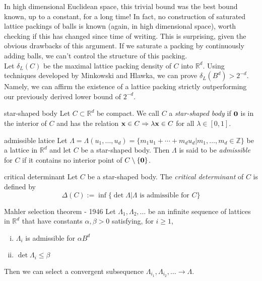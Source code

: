 \documentclass{article}
\begin{document}
In high dimensional Euclidean space, this trivial bound was the best bound known, up to a constant, for a long 
time! In fact, no construction of saturated lattice packings of balls is known (again, in high dimensional space), worth 
checking if this has changed since time of writing. This is surprising, given the obvious drawbacks of this argument. 
If we saturate a packing by continuously adding balls, we can't control the structure of this packing. \\ 

Let $\delta_L(C)$ be the maximal lattice packing density of $C$ into $\mathbb{R}^d$. Using techniques developed by 
Minkowski and Hlawka, we can prove $\delta_L(B^d) > 2^{-d}$. Namely, we can affirm the existence of a lattice packing 
strictly outperforming our previously derived lower bound of $2^{-d}$.  

\begin{definition}[]{star-shaped body}
    Let $C \subset \mathbb{R}^d$ be compact. We call $C$ a {\it star-shaped body} if ${\bf 0}$ is in the interior 
    of $C$ and has the relation ${\bf x} \in C \Rightarrow \lambda {\bf x} \in C$ for all $\lambda \in [0, 1]$.
\end{definition}

\begin{definition}[]{admissible latice}
    Let $\Lambda = \Lambda(u_1, \dots, u_d) = \{m_1 u_1 + \cdots + m_d u_d | m_1, \dots, m_d \in \mathbb{Z}\}$ be a 
    lattice in $\mathbb{R}^d$ and let $C$ be a star-shaped body. Then $\Lambda$ is said to be {\it admissible} for 
    $C$ if it contains no interior point of $C\setminus \{{\bf 0}\}$.
\end{definition}

\begin{definition}[]{critical determinant}
    Let $C$ be a star-shaped body. The {\it critical determinant} of $C$ is defined by 
    \[\Delta(C) := \inf \{\det \Lambda | \Lambda \text{ is admissible for } C\}\]
\end{definition}

\begin{lemma}[]{Mahler selection theorem - 1946}
    Let $\Lambda_1, \Lambda_2, \dots$ be an infinite sequence of lattices in $\mathbb{R}^d$ that have constants 
    $\alpha, \beta > 0$ satisfying, for $i \geq 1$, 
    \begin{enumerate}[(i)]
        \item $\Lambda_i$ is admissible for $\alpha B^d$
        \item $\det \Lambda_i \leq \beta$
    \end{enumerate}
    Then we can select a convergent subsequence $\Lambda_{i_1}, \Lambda_{i_2}, \dots \to \Lambda$.
\end{lemma}
\end{document}
